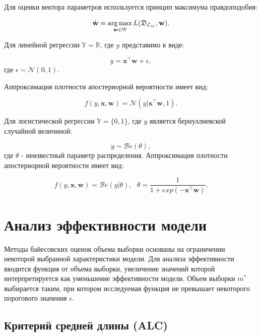 \documentclass[12pt,twoside]{article}
\begin{document}
Для оценки вектора параметров используется принцип максимума правдоподобия:

$$
\hat{\textbf{w}} = \argmax_{\textbf{w} \in \mathbb{W}} L(\mathfrak D_{\mathcal L_m}, \textbf{w}).
$$





Для линейной регрессии $\mathbb{Y} = \mathbb{R}$, где $y$ представимо в виде:

$$
y = \textbf{x}^{\top}\textbf{w} + \epsilon,
$$
где $\epsilon \sim \mathcal{N}(0, 1)$. 

Аппроксимация плотности апостериорной вероятности имеет вид:

$$
f(y, \textbf{x}, \textbf{w}) = \mathcal{N}(y|\textbf{x}^{\top}\textbf{w}, 1).
$$ 

Для логистической регрессии $\mathbb{Y} = \{0, 1\}$, где $y$ является бернуллиевской случайной величиной:

$$
y \sim \mathcal{B}e(\theta),
$$
где $\theta$ - неизвестный параметр распределения. Аппроксимация плотности апостериорной вероятности имеет вид:

$$
f(y, \textbf{x}, \textbf{w}) = \mathcal{B}e(y|\theta),~~~ \theta = \frac{1}{1 + exp(-\textbf{x}^{\top}\textbf{w})}.
$$

\section{Анализ эффективности модели}

Методы байесовских оценок объема выборки основаны на ограничении некоторой выбранной характеристики модели. Для анализа эффективности вводится функция от объема выборки, увеличение значений которой интерпретируется как уменьшение эффективности модели. Объем выборки $m^{*}$ выбирается таким, при котором исследуемая функция не превышает некоторого порогового значения $\epsilon$.

\subsection{Критерий средней длины (ALC)}
\end{document}
